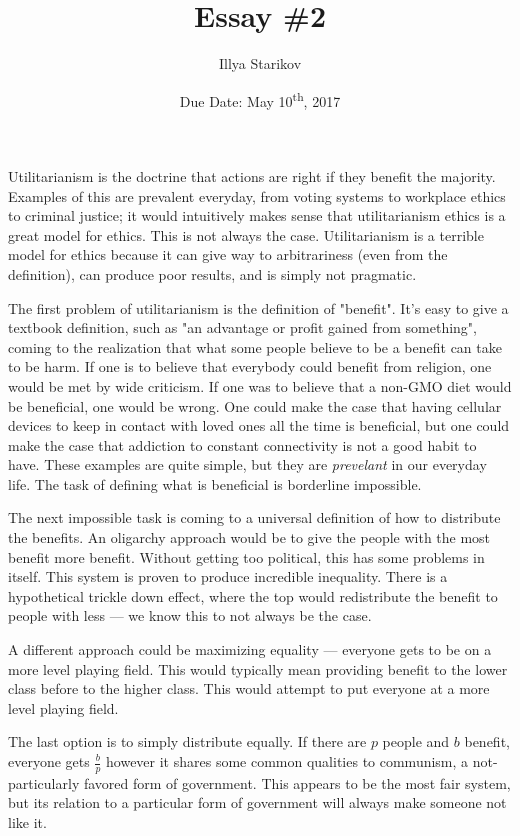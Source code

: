 \documentclass[12pt]{article}
\title{Essay \#2}
\date{Due Date: May 10\textsuperscript{th}, 2017}
\author{Illya Starikov}
\newcommand{\source}[1]{\footnote{\url{#1}}}
\let\footnote=\endnote
\begin{document}
\maketitle

Utilitarianism is the doctrine that actions are right if they benefit the majority. Examples of this are prevalent everyday, from voting systems to workplace ethics to criminal justice; it would intuitively makes sense that utilitarianism ethics is a great model for ethics. This is not always the case. Utilitarianism is a terrible model for ethics because it can give way to arbitrariness (even from the definition), can produce poor results, and is simply not pragmatic.

The first problem of utilitarianism is the definition of "benefit". It's easy to give a textbook definition, such as "an advantage or profit gained from something"\source{http://www.dictionary.com/browse/benefit}, coming to the realization that what some people believe to be a benefit can take to be harm. If one is to believe that everybody could benefit from religion, one would be met by wide criticism. If one was to believe that a non-GMO diet would be beneficial, one would be wrong. One could make the case that having cellular devices to keep in contact with loved ones all the time is beneficial, but one could make the case that addiction to constant connectivity is not a good habit to have. These examples are quite simple, but they are \textit{prevelant} in our everyday life. The task of defining what is beneficial is borderline impossible.

The next impossible task is coming to a universal definition of how to distribute the benefits. An oligarchy approach would be to give the people with the most benefit more benefit. Without getting too political, this has some problems in itself. This system is proven to produce incredible inequality. There is a hypothetical trickle down effect, where the top would redistribute the benefit to people with less --- we know this to not always be the case.

A different approach could be maximizing equality --- everyone gets to be on a more level playing field. This would typically mean providing benefit to the lower class before to the higher class. This would attempt to put everyone at a more level playing field.

The last option is to simply distribute equally. If there are $p$ people and $b$ benefit, everyone gets $\frac{b}{p}$ however it shares some common qualities to communism, a not-particularly favored form of government. This appears to be the most fair system, but its relation to a particular form of government will always make someone not like it.
\end{document}
